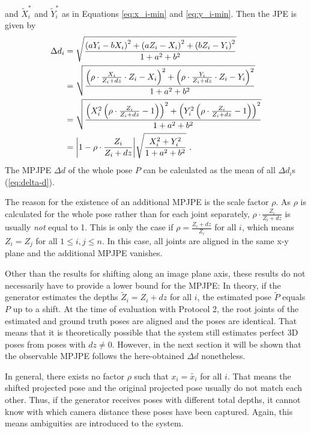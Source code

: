 and $\widetilde{X}_i^\ast$ and $\widetilde{Y}_i^\ast$ as in Equations \eqref{eq:x_i-min} and \eqref{eq:y_i-min}.
Then the JPE  is given by 
\begin{align}
	\label{eq:z-shift-error}
	\Delta d_i &= \sqrt{\frac{\left (a Y_i - b X_i \right )^2 + \left (a Z_i - X_i \right )^2 + \left (b Z_i - Y_i \right )^2}{1 + a^2 + b^2}} \\ 
	&= \sqrt{\frac{\left (\rho \cdot \frac{X_i}{Z_i + dz}\cdot Z_i - X_i \right )^2 + \left (\rho \cdot \frac{Y_i }{Z_i + dz}\cdot Z_i- Y_i \right )^2}{1 + a^2 + b^2}} \\
	&= \sqrt{\frac{\left (X_i^2 \left (\rho \cdot \frac{Z_i}{Z_i + dz} - 1 \right) \right )^2 + \left (Y_i^2 \left (\rho \cdot \frac{Z_i}{Z_i + dz}-1 \right ) \right )^2}{1 + a^2 + b^2}} \\
	&= \abs{1 - \rho \cdot \frac{Z_i}{Z_i + dz}}  \sqrt{\frac{X_i^2 + Y_i^2}{1 + a^2 + b^2}}\ .
\end{align}
The MPJPE $\Delta d$ of the whole pose $P$ can be calculated as the mean of all $\Delta d_i$s (\autoref{eq:delta-d}).

The reason for the existence of an additional MPJPE is the scale factor $\rho$.
As $\rho$ is calculated for the whole pose rather than for each joint separately, $\rho \cdot \frac{Z_i}{Z_i + dz}$ is usually \emph{not} equal to 1.
This is only the case if $\rho = \frac{Z_i + dz}{Z_i}$ for all $i$, which means $Z_i = Z_j$ for all $1 \leq i, j \leq n$.
In this case, all joints are aligned in the same x-y plane and the additional MPJPE vanishes.

Other than the results for shifting along an image plane axis, these results do not necessarily have to provide a lower bound for the MPJPE:
In theory, if the generator estimates the depths $\widetilde{Z}_i = Z_i + dz$ for all $i$, the estimated pose $\widetilde{P}$ equals $P$ up to a shift.
At the time of evaluation with Protocol 2, the root joints of the estimated and ground truth poses are aligned and the poses are identical.
That means that it is theoretically possible that the system still estimates perfect 3D poses from poses with $dz \neq 0$.
However, in the next section it will be shown that the observable MPJPE follows the here-obtained $\Delta d$ nonetheless.

In general, there exists no factor $\rho$ such that $x_i = \widetilde{x_i}$ for all $i$.
That means the shifted projected pose and the original projected pose usually do not match each other.
Thus, if the generator receives poses with different total depths, it cannot know with which camera distance these poses have been captured.
Again, this means ambiguities are introduced to the system.

